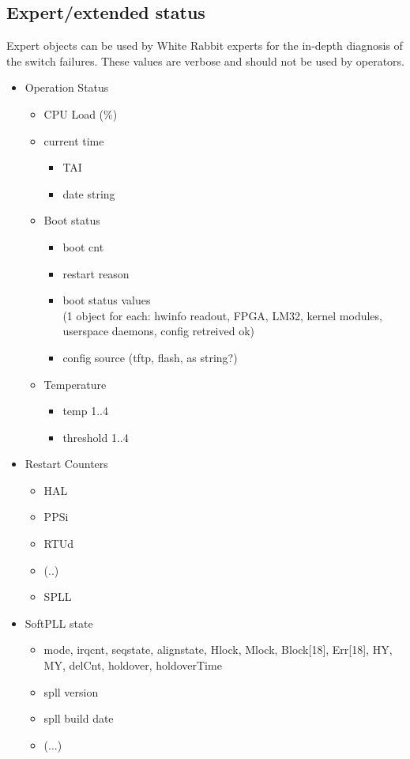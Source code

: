 
\newpage
\subsection{Expert/extended status}
Expert objects can be used by White Rabbit experts for the in-depth diagnosis of
the switch failures. These values are verbose and should not be used by
operators.

\begin{itemize}
  \item Operation Status
  \begin{itemize}
    \item CPU Load (\%)
    \item current time
    \begin{itemize}
      \item TAI
      \item date string
    \end{itemize}
    \item Boot status
    \begin{itemize}
      \item boot cnt
      \item restart reason
      \item boot status values\\
        (1 object for each: hwinfo readout, FPGA, LM32, kernel modules, userspace daemons, config retreived ok)
      \item config source (tftp, flash, as string?)
    \end{itemize}
    \item Temperature
    \begin{itemize}
      \item temp 1..4
      \item threshold 1..4
    \end{itemize}
  \end{itemize}

  \item Restart Counters
    \begin{itemize}
      \item HAL
      \item PPSi
      \item RTUd
      \item (..)
      \item SPLL
    \end{itemize}

  \item SoftPLL state
  \begin{itemize}
	  \item mode, irqcnt, seqstate, alignstate, Hlock, Mlock, Block[18], Err[18], HY, MY, delCnt, holdover, holdoverTime
	  \item spll version
	  \item spll build date
	  \item (...)
  \end{itemize}


\end{itemize}
